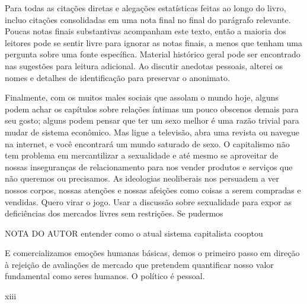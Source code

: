  \par 
Para todas as citações diretas e alegações estatísticas feitas ao longo do livro, incluo citações consolidadas em uma nota final no final do parágrafo relevante. Poucas notas finais substantivas acompanham este texto, então a maioria dos leitores pode se sentir livre para ignorar as notas finais, a menos que tenham uma pergunta sobre uma fonte específica. Material histórico geral pode ser encontrado nas sugestões para leitura adicional. Ao discutir anedotas pessoais, alterei os nomes e detalhes de identificação para preservar o anonimato.
 \par 
Finalmente, com os muitos males sociais que assolam o mundo hoje, alguns podem achar os capítulos sobre relações íntimas um pouco obscenos demais para seu gosto; alguns podem pensar que ter um sexo melhor é uma razão trivial para mudar de sistema econômico. Mas ligue a televisão, abra uma revista ou navegue na internet, e você encontrará um mundo saturado de sexo. O capitalismo não tem problema em mercantilizar a sexualidade e até mesmo se aproveitar de nossas inseguranças de relacionamento para nos vender produtos e serviços que não queremos ou precisamos. As ideologias neoliberais nos persuadem a ver nossos corpos, nossas atenções e nossas afeições como coisas a serem compradas e vendidas. Quero virar o jogo. Usar a discussão sobre sexualidade para expor as deficiências dos mercados livres sem restrições. Se pudermos
 \par 
NOTA DO AUTOR entender como o atual sistema capitalista cooptou
 \par 
E comercializamos emoções humanas básicas, demos o primeiro passo em direção à rejeição de avaliações de mercado que pretendem quantificar nosso valor fundamental como seres humanos. O político é pessoal.
 \par 
xiii